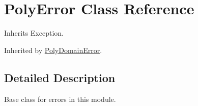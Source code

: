 \hypertarget{classpyneb_1_1utils_1_1polyutils_1_1_poly_error}{}\section{Poly\+Error Class Reference}
\label{classpyneb_1_1utils_1_1polyutils_1_1_poly_error}


Inherits Exception.



Inherited by \hyperlink{classpyneb_1_1utils_1_1polyutils_1_1_poly_domain_error}{Poly\+Domain\+Error}.



\subsection{Detailed Description}
\begin{DoxyVerb}Base class for errors in this module.\end{DoxyVerb}
 